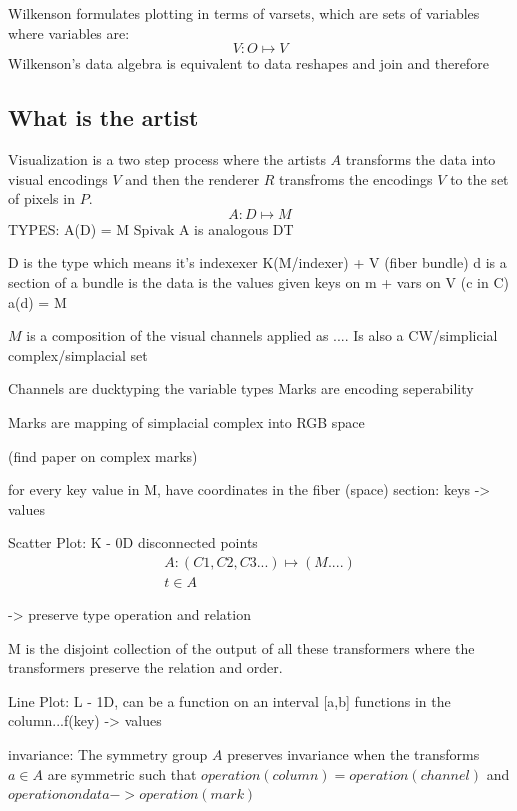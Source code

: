 \documentclass[letterpaper,onecolumn,titlepage]{Ythesis}
\begin{document}
Wilkenson formulates plotting in terms of varsets, which are sets of variables where variables are:
\begin{equation}
V:O\mapsto V    
\end{equation}
Wilkenson's data algebra is equivalent to data reshapes and join and therefore \cite{wickhamLayeredGrammarGraphics2010,wilkinsonGrammarGraphics2005}


\subsection{What is the artist}
Visualization is a two step process where the artists $A$ transforms the data into visual encodings $V$ and then the renderer $R$ transfroms the encodings $V$ to the set of pixels in $P$.
\begin{equation}
    \label{eq:artist}
    A: D \mapsto M
\end{equation}
TYPES: A(D) = M
Spivak A is analogous DT

D is the type  which means it's indexexer K(M/indexer) + V (fiber bundle)
d is a section of a bundle is the data is the values given keys on m + vars on V (c in C)
a(d) = M

$M$ is a composition of the visual channels applied as ....
Is also a CW/simplicial complex/simplacial set 

Channels are ducktyping the variable types
Marks are encoding seperability 

Marks are mapping of simplacial complex into RGB space

(find paper on complex marks)

for every key value in M, have coordinates in the fiber (space)
section: keys -> values 

Scatter Plot:
K - 0D disconnected points
\begin{multline}
A: (C1, C2, C3...)\mapsto (M....)\\
t \in A
\end{multline}

-> preserve type operation and relation

M is the disjoint collection of the output of all these transformers where the transformers preserve the relation and order. 

Line Plot:
L - 1D, can be a function on an interval [a,b]
functions in the column...f(key) -> values

invariance: The symmetry group $A$ preserves invariance when the transforms $a \in A$ are symmetric such that $operation(column) = operation(channel)$ and $operation on data -> operation (mark)$
\end{document}
